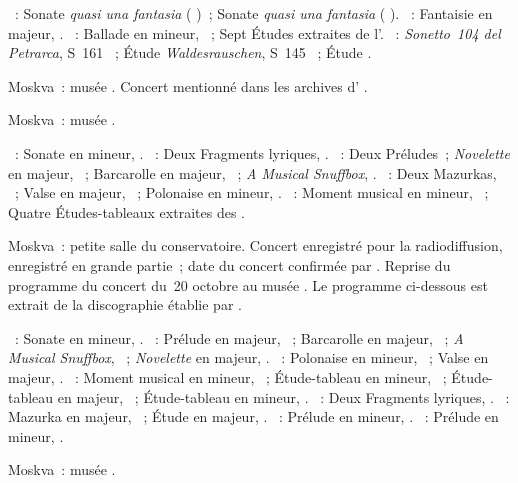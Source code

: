 \begin{description}
 \textsc{\Beethoven{}}~: Sonate \emph{quasi una fantasia} 
 ( )~; Sonate \emph{quasi una fantasia} 
 ( ).
 \textsc{\Schumann{}}~: Fantaisie en \kC majeur, .
 \textsc{\Chopin{}}~: Ballade  en \kF mineur, ~; Sept
 Études extraites de l'.
 \textsc{\Liszt{}}~: \emph{Sonetto~104 del Petrarca}, S~161 ~;
 Étude \emph{Waldesrauschen}, S~145 ~; Étude .
 \item[\DateWithWeekDay{1951-09-22}]
 Moskva~: musée \Scriabine{}.
 Concert mentionné dans les archives d'\AVizel{}
 \citep[voir][p.~171]{Nekrasova08}.
 \item[\DateWithWeekDay{1951-10-20}]
 Moskva~: musée \Scriabine{}.

 \textsc{\Glazounov{}}~: Sonate en \kE mineur, .
 \textsc{\Blumenfeld{}}~: Deux Fragments lyriques, .
 \textsc{\Liadov{}}~: Deux Préludes~; \emph{Novelette} en \kC majeur,
 ~; Barcarolle en \kF \Sharp majeur, ~; \emph{A Musical
 Snuffbox}, .
 \textsc{\Scriabine{}}~: Deux Mazurkas, ~; Valse en \kA \Flat
 majeur, ~; Polonaise en \kB \Flat mineur, .
 \textsc{\Rachmaninov{}}~: Moment musical en \kE \Flat mineur, 
 ~; Quatre Études-tableaux extraites des .
 \item[\DateWithWeekDay{1951-10-26}]
 Moskva~: petite salle du conservatoire.
 Concert enregistré pour la radiodiffusion, enregistré en grande partie~;
 date du concert confirmée par \citet[p.~80]{Nikonovich08a}.
 Reprise du programme du concert du~20 octobre au musée \Scriabine{}.
 Le programme ci-dessous est extrait de la discographie établie par
 \citet[p.~29]{Nikonovich11} \citep[voir aussi][p.~392]{Scriabine}.

 \textsc{\Glazounov{}}~: Sonate en \kE mineur, .
 \textsc{\Liadov{}}~: Prélude en \kD \Flat majeur,  ~;
 Barcarolle en \kF \Sharp majeur, ~; \emph{A Musical Snuffbox},
 ~; \emph{Novelette} en \kC majeur, .
 \textsc{\Scriabine{}}~: Polonaise en \kB \Flat mineur, ~; Valse en
 \kA \Flat majeur, .
 \textsc{\Rachmaninov{}}~: Moment musical en \kE \Flat mineur, 
 ~; Étude-tableau en \kE \Flat mineur,  ~;
 Étude-tableau en \kC majeur,  ~; Étude-tableau en \kG
 mineur,  .
 \textsc{\Blumenfeld{}}~: Deux Fragments lyriques, .
 \textsc{\Scriabine{}}~: Mazurka en \kF \Sharp majeur, 
 ~; Étude en \kD \Flat majeur,  .
 \textsc{\Rachmaninov{}}~: Prélude en \kG \Sharp mineur, 
 .
 \textsc{\Scriabine{}}~: Prélude en \kF mineur,  .
 \item[\DateWithWeekDay{1951-11-22}]
 Moskva~: musée \Scriabine{}.


\end{description}
